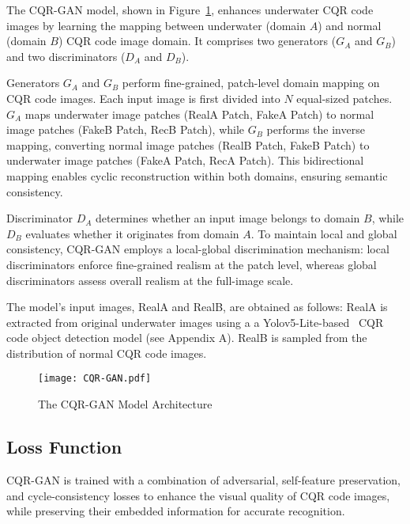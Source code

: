 \documentclass[preprint,12pt]{elsarticle}
\begin{document}
The CQR-GAN model, shown in Figure~\ref{model}, enhances underwater CQR code images by learning the mapping between underwater (domain $A$) and normal (domain $B$) CQR code image domain. It comprises two generators ($G_A$ and $G_B$) and two discriminators ($D_A$ and $D_B$). 

Generators $G_A$ and $G_B$ perform fine-grained, patch-level domain mapping on CQR code images. Each input image is first divided into $N$ equal-sized patches.
$G_A$ maps underwater image patches (RealA Patch, FakeA Patch) to normal image patches (FakeB Patch, RecB Patch), while $G_B$ performs the inverse mapping, converting normal image patches (RealB Patch, FakeB Patch) to underwater image patches (FakeA Patch, RecA Patch).
This bidirectional mapping enables cyclic reconstruction within both domains, ensuring semantic consistency. 

Discriminator $D_A$ determines whether an input image belongs to domain $B$, while $D_B$ evaluates whether it originates from domain $A$.
To maintain local and global consistency, CQR-GAN employs a local-global discrimination mechanism: local discriminators enforce fine-grained realism at the patch level, whereas global discriminators assess overall realism at the full-image scale.

The model’s input images, RealA and RealB, are obtained as follows: RealA is extracted from original underwater images using a a Yolov5-Lite-based~\cite{yolov5lite2021} CQR code object detection model (see Appendix A). 
RealB is sampled from the distribution of normal CQR code images.


\begin{figure}[t]
\centering
\texttt{[image: CQR-GAN.pdf]}
\caption{The CQR-GAN Model Architecture}
\label{model}
\end{figure}

\subsection{Loss Function}
CQR-GAN is trained with a combination of adversarial, self-feature preservation, and cycle-consistency losses to enhance the visual quality of CQR code images, while preserving their embedded information for accurate recognition.
\end{document}
